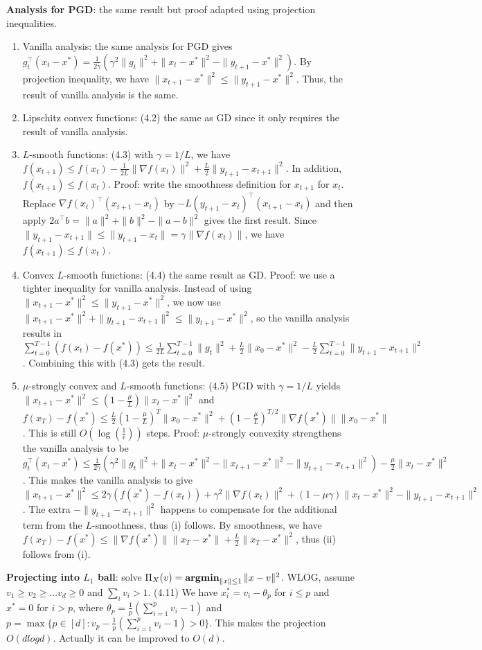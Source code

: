 \textbf{Analysis for PGD}: the same result but proof adapted using projection inequalities.
\begin{enumerate}
    \item Vanilla analysis: the same analysis for PGD gives $g_t^\top (x_t - x^*) = \frac{1}{2\gamma}\left(\gamma^2 \|g_t\|^2 + \|x_t - x^*\|^2 - \|y_{t+1}-x^*\|^2\right)$. By projection inequality, we have $\|x_{t+1} - x^*\|^2 \le \|y_{t+1} - x^*\|^2$. Thus, the result of vanilla analysis is the same.
    \item Lipschitz convex functions: (4.2) the same as GD since it only requires the result of vanilla analysis.
    \item $L$-smooth functions: (4.3) with $\gamma = 1/L$, we have $f(x_{t+1}) \le f(x_t) - \frac{1}{2L}\|\nabla f(x_t)\|^2 + \frac{L}{2}\|y_{t+1} - x_{t+1}\|^2$. In addition, $f(x_{t+1}) \le f(x_t)$. Proof: write the smoothness definition for $x_{t+1}$ for $x_t$. Replace $\nabla f(x_t)^\top (x_{t+1} - x_t)$ by $-L (y_{t+1} - x_t)^\top (x_{t+1} - x_t)$ and then apply $2a^\top b = \|a\|^2 + \|b\|^2 - \|a - b\|^2$ gives the first result. Since $\|y_{t+1} - x_{t+1}\| \le \|y_{t+1} - x_t\| = \gamma \|\nabla f(x_t)\|$, we have $f(x_{t+1}) \le f(x_t)$.
    \item Convex $L$-smooth functions: (4.4) the same result as GD. Proof: we use a tighter inequality for vanilla analysis. Instead of using $\|x_{t+1} - x^*\|^2 \le \|y_{t+1} - x^*\|^2$, we now use $\|x_{t+1} - x^*\|^2 + \|y_{t+1} - x_{t+1}\|^2 \le \|y_{t+1} - x^*\|^2$, so the vanilla analysis results in $\sum_{t=0}^{T-1} (f(x_t) - f(x^*)) \le \frac{1}{2L}\sum_{t=0}^{T-1} \|g_t\|^2 + \frac{L}{2}\|x_0 - x^*\|^2 - \frac{L}{2}\sum_{t=0}^{T-1} \|y_{t+1} - x_{t+1}\|^2$. Combining this with (4.3) gets the result.
    \item $\mu$-strongly convex and $L$-smooth functions: (4.5) PGD with $\gamma = 1/L$ yields $\|x_{t+1}-x^*\|^2 \le (1-\frac{\mu}{L})\|x_t - x^*\|^2$ and $f(x_T) - f(x^*) \le \frac{L}{2}(1-\frac{\mu}{L})^T \|x_0 -x^*\|^2 + (1-\frac{\mu}{L})^{T/2}\|\nabla f(x^*)\|\|x_0 - x^*\|$. This is still $O(\log(\frac{1}{\epsilon}))$ steps. Proof: $\mu$-strongly convexity strengthens the vanilla analysis to be $g_t^\top (x_t - x^*) \le \frac{1}{2\gamma}(\gamma^2 \|g_t\|^2 + \|x_t - x^*\|^2 - \|x_{t+1}-x^*\|^2 - \|y_{t+1} - x_{t+1}\|^2) - \frac{\mu}{2}\|x_t - x^*\|^2$. This makes the vanilla analysis to give $\|x_{t+1}-x^*\|^2 \le 2\gamma \left(f(x^*) - f(x_t)\right) + \gamma^2 \|\nabla f(x_t)\|^2 + (1-\mu\gamma)\|x_t - x^*\|^2 - \|y_{t+1} - x_{t+1}\|^2$. The extra $- \|y_{t+1} - x_{t+1}\|^2$ happens to compensate for the additional term from the $L$-smoothness, thus (i) follows. By smoothness, we have $f(x_T) - f(x^*) \le \|\nabla f(x^*)\| \|x_T - x^*\| + \frac{L}{2} \|x_T - x^*\|^2$, thus (ii) follows from (i).
\end{enumerate}

\textbf{Projecting into $L_1$ ball}: solve $\Pi_X(v) = \operatorname{\textbf{argmin}}_{\|x\|\le 1}\|x-v\|^2$. WLOG, assume $v_1 \ge v_2 \ge \dots v_d \ge 0$ and $\sum_i v_i > 1$. (4.11) We have $x_i^* = v_i - \theta_p$ for $i\le p$ and $x^*=0$ for $i>p$, where $\theta_p = \frac{1}{p}(\sum_{i=1}^p v_i -1)$ and $p=\max\{p \in [d]: v_p - \frac{1}{p}(\sum_{i=1}^p v_i - 1)>0\}$. This makes the projection $O(dlog d)$. Actually it can be improved to $O(d)$.